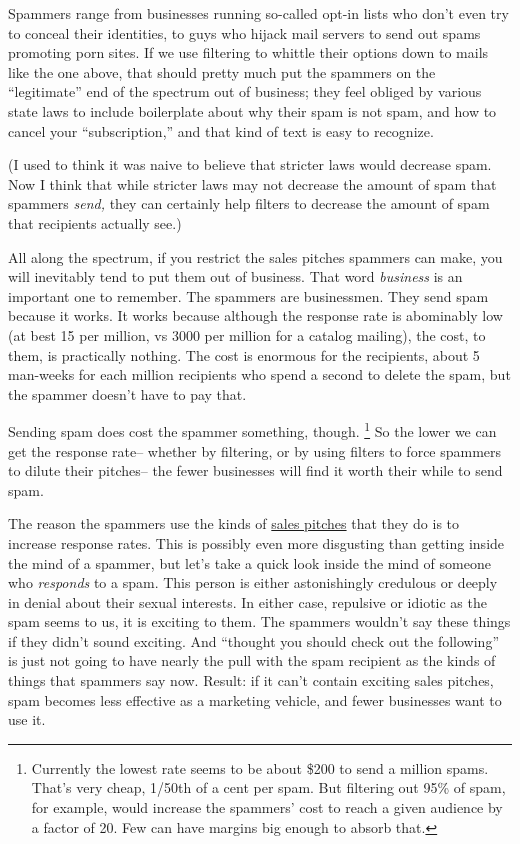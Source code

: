 \documentclass[12pt]{book}
\begin{document}
Spammers range from businesses running so-called opt-in lists who don't
even try to conceal their identities, to guys who hijack mail servers to
send out spams promoting porn sites. If we use filtering to whittle
their options down to mails like the one above, that should pretty much
put the spammers on the ``legitimate'' end of the spectrum out of
business; they feel obliged by various state laws to include boilerplate
about why their spam is not spam, and how to cancel your
``subscription,'' and that kind of text is easy to recognize.

(I used to think it was naive to believe that stricter laws would
decrease spam. Now I think that while stricter laws may not decrease the
amount of spam that spammers \emph{send,} they can certainly help
filters to decrease the amount of spam that recipients actually see.)

All along the spectrum, if you restrict the sales pitches spammers can
make, you will inevitably tend to put them out of business. That word
\emph{business} is an important one to remember. The spammers are
businessmen. They send spam because it works. It works because although
the response rate is abominably low (at best 15 per million, vs 3000 per
million for a catalog mailing), the cost, to them, is practically
nothing. The cost is enormous for the recipients, about 5 man-weeks for
each million recipients who spend a second to delete the spam, but the
spammer doesn't have to pay that.

Sending spam does cost the spammer something, though. \footnote{Currently the lowest rate seems to be about \$200 to send a
million spams. That's very cheap, 1/50th of a cent per spam. But
filtering out 95\% of spam, for example, would increase the spammers'
cost to reach a given audience by a factor of 20. Few can have margins
big enough to absorb that.} So the
lower we can get the response rate-- whether by filtering, or by using
filters to force spammers to dilute their pitches-- the fewer businesses
will find it worth their while to send spam.

The reason the spammers use the kinds of
\href{http://www.milliondollaremails.com}{sales pitches} that they do is
to increase response rates. This is possibly even more disgusting than
getting inside the mind of a spammer, but let's take a quick look inside
the mind of someone who \emph{responds} to a spam. This person is either
astonishingly credulous or deeply in denial about their sexual
interests. In either case, repulsive or idiotic as the spam seems to us,
it is exciting to them. The spammers wouldn't say these things if they
didn't sound exciting. And ``thought you should check out the
following'' is just not going to have nearly the pull with the spam
recipient as the kinds of things that spammers say now. Result: if it
can't contain exciting sales pitches, spam becomes less effective as a
marketing vehicle, and fewer businesses want to use it.
\end{document}
